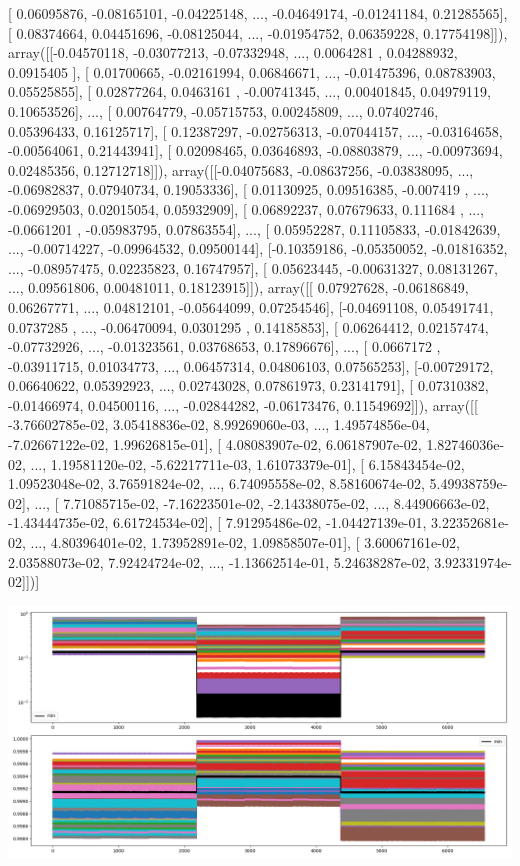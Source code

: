 \documentclass{article}
\begin{document}
       [ 0.06095876, -0.08165101, -0.04225148, ..., -0.04649174,
        -0.01241184,  0.21285565],
       [ 0.08374664,  0.04451696, -0.08125044, ..., -0.01954752,
         0.06359228,  0.17754198]]), array([[-0.04570118, -0.03077213, -0.07332948, ...,  0.0064281 ,
         0.04288932,  0.0915405 ],
       [ 0.01700665, -0.02161994,  0.06846671, ..., -0.01475396,
         0.08783903,  0.05525855],
       [ 0.02877264,  0.0463161 , -0.00741345, ...,  0.00401845,
         0.04979119,  0.10653526],
       ..., 
       [ 0.00764779, -0.05715753,  0.00245809, ...,  0.07402746,
         0.05396433,  0.16125717],
       [ 0.12387297, -0.02756313, -0.07044157, ..., -0.03164658,
        -0.00564061,  0.21443941],
       [ 0.02098465,  0.03646893, -0.08803879, ..., -0.00973694,
         0.02485356,  0.12712718]]), array([[-0.04075683, -0.08637256, -0.03838095, ..., -0.06982837,
         0.07940734,  0.19053336],
       [ 0.01130925,  0.09516385, -0.007419  , ..., -0.06929503,
         0.02015054,  0.05932909],
       [ 0.06892237,  0.07679633,  0.111684  , ..., -0.0661201 ,
        -0.05983795,  0.07863554],
       ..., 
       [ 0.05952287,  0.11105833, -0.01842639, ..., -0.00714227,
        -0.09964532,  0.09500144],
       [-0.10359186, -0.05350052, -0.01816352, ..., -0.08957475,
         0.02235823,  0.16747957],
       [ 0.05623445, -0.00631327,  0.08131267, ...,  0.09561806,
         0.00481011,  0.18123915]]), array([[ 0.07927628, -0.06186849,  0.06267771, ...,  0.04812101,
        -0.05644099,  0.07254546],
       [-0.04691108,  0.05491741,  0.0737285 , ..., -0.06470094,
         0.0301295 ,  0.14185853],
       [ 0.06264412,  0.02157474, -0.07732926, ..., -0.01323561,
         0.03768653,  0.17896676],
       ..., 
       [ 0.0667172 , -0.03911715,  0.01034773, ...,  0.06457314,
         0.04806103,  0.07565253],
       [-0.00729172,  0.06640622,  0.05392923, ...,  0.02743028,
         0.07861973,  0.23141791],
       [ 0.07310382, -0.01466974,  0.04500116, ..., -0.02844282,
        -0.06173476,  0.11549692]]), array([[ -3.76602785e-02,   3.05418836e-02,   8.99269060e-03, ...,
          1.49574856e-04,  -7.02667122e-02,   1.99626815e-01],
       [  4.08083907e-02,   6.06187907e-02,   1.82746036e-02, ...,
          1.19581120e-02,  -5.62217711e-03,   1.61073379e-01],
       [  6.15843454e-02,   1.09523048e-02,   3.76591824e-02, ...,
          6.74095558e-02,   8.58160674e-02,   5.49938759e-02],
       ..., 
       [  7.71085715e-02,  -7.16223501e-02,  -2.14338075e-02, ...,
          8.44906663e-02,  -1.43444735e-02,   6.61724534e-02],
       [  7.91295486e-02,  -1.04427139e-01,   3.22352681e-02, ...,
          4.80396401e-02,   1.73952891e-02,   1.09858507e-01],
       [  3.60067161e-02,   2.03588073e-02,   7.92424724e-02, ...,
         -1.13662514e-01,   5.24638287e-02,   3.92331974e-02]])]
\begin{center}
\includegraphics[scale=.9]{control_dpn_all.png}

\end{center}
\end{document}
